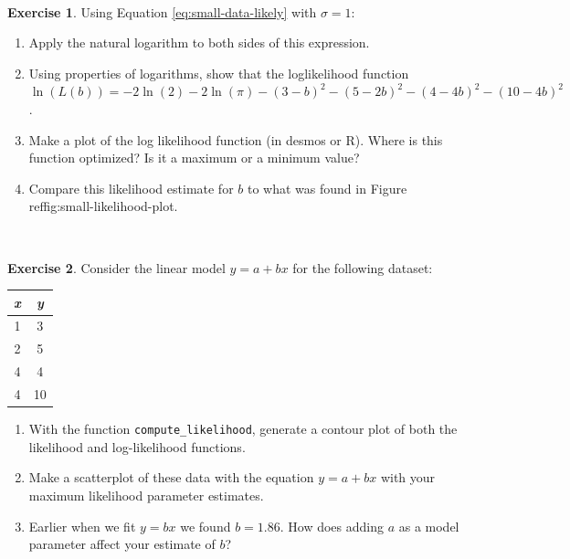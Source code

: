 \documentclass[
]{book}
\theoremstyle{definition}
\theoremstyle{definition}
\theoremstyle{definition}
\newtheorem{exercise}{Exercise}[chapter]
\theoremstyle{remark}
\begin{document}
~

\begin{exercise}
\protect\hypertarget{exr:unnamed-chunk-169}{}{\label{exr:unnamed-chunk-169} }Using Equation \eqref{eq:small-data-likely} with \(\sigma = 1\):

\begin{enumerate}[label=\alph*.]
  \item Apply the natural logarithm to both sides of this expression.
  \item Using properties of logarithms, show that the loglikelihood function $\ln(L(b)) =-2 \ln(2) - 2 \ln (\pi) -(3-b)^{2}-(5-2b)^{2}-(4-4b)^{2}-(10-4b)^{2}$.
\item Make a plot of the log likelihood function (in desmos or R).  Where is this function optimized?  Is it a maximum or a minimum value?
  \item Compare this likelihood estimate for $b$ to what was found in Figure \\ref{fig:small-likelihood-plot}. 
  \end{enumerate}
\end{exercise}

~

\begin{exercise}
\protect\hypertarget{exr:full-linear}{}{\label{exr:full-linear} }Consider the linear model \(y=a+bx\) for the following dataset:

\begin{longtable}[]{@{}cc@{}}
\toprule
\emph{x} & \emph{y} \\
\midrule
\endhead
1 & 3 \\
2 & 5 \\
4 & 4 \\
4 & 10 \\
\bottomrule
\end{longtable}

\begin{enumerate}[label=\alph*.]
\item With the function \texttt{compute\_likelihood}, generate a contour plot of both the likelihood and log-likelihood functions.
\item Make a scatterplot of these data with the equation $y=a+bx$ with your maximum likelihood parameter estimates.
\item Earlier when we fit $y=bx$ we found $b=1.86$. How does adding $a$ as a model parameter affect your estimate of $b$?
\end{enumerate}
\end{exercise}
\end{document}
